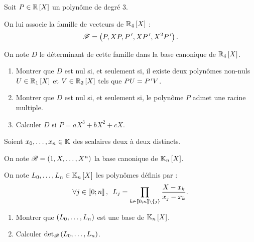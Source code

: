 \begin{corr}
\end{corr}

\begin{exo}
Soit \(P\in\poly[\R]\) un polynôme de degré \(3\).

On lui associe la famille de vecteurs de \(\polydeg[\R]{4}\) : \[\mathscr{F}=\left(P,XP,P^{\,\prime},XP^{\,\prime},X^2P^{\,\prime}\right).\]

On note \(D\) le déterminant de cette famille dans la base canonique de \(\polydeg[\R]{4}\).

\begin{enumerate}
\item Montrer que \(D\) est nul si, et seulement si, il existe deux polynômes non-nuls \(U\in\polydeg[\R]{1}\) et \(V\in\polydeg[\R]{2}\) tels que \(PU=P^{\,\prime} V\). \\

\item Montrer que \(D\) est nul si, et seulement si, le polynôme \(P\) admet une racine multiple. \\

\item Calculer \(D\) si \(P=aX^3+bX^2+cX\).
\end{enumerate}
\end{exo}

\begin{corr}
\end{corr}

\begin{exo}
Soient \(x_0,\dots,x_n\in\mathbb{K}\) des scalaires deux à deux distincts.

On note \(\mathscr{B}=\left(1,X,\dots,X^n\right)\) la base canonique de \(\polydeg{n}\).

On note \(L_0,\dots,L_n\in\polydeg{n}\) les polynômes définis par : \[\quantifs{\forall j\in\interventierii{0}{n}}L_j=\prod_{k\in\interventierii{0}{n}\excluant\accol{j}}\dfrac{X-x_k}{x_j-x_k}.\]

\begin{enumerate}
\item Montrer que \(\left(L_0,\dots,L_n\right)\) est une base de \(\polydeg{n}\). \\

\item Calculer \({\det}_{\mathscr{B}}\left(L_0,\dots,L_n\right)\).
\end{enumerate}
\end{exo}

